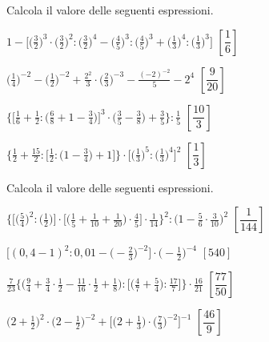 \begin{esercizio}[\Ast]
\label{ese:3.149}
Calcola il valore delle seguenti espressioni.
\begin{enumeratea}
\spazielenx
\item \(\displaystyle{1-\bigg[\bigg(\frac{3}{2}\bigg)^{3}\cdot%
\bigg(\frac{3}{2}\bigg)^{2}:\bigg(\frac{3}{2}\bigg)^{4}-
\bigg(\frac{4}{5}\bigg)^{3}:\bigg(\frac{4}{5}\bigg)^{3}+%
\bigg(\frac{1}{3}\bigg)^{4}:\bigg(\frac{1}{3}\bigg)^{3}\bigg]}\)
  \hfill \(\left[\dfrac{1}{6} \right]\)
\item \(\displaystyle{\bigg(\frac{1}{4}\bigg)^{-2}-\bigg(\frac{1}{2}\bigg)^{-2}+
\frac{2^{2}}{3}\cdot%
\bigg(\frac{2}{3}\bigg)^{-3}-\frac{(-2)^{-2}}{5}-2^{4}}\)
  \hfill \(\left[\dfrac{9}{20} \right]\)
\item \(\displaystyle{\bigg\{\bigg[\frac{1}{6}+\frac{1}{2}:\bigg(\frac{6}{8}+1-
\frac{3}{4}\bigg)\bigg]^{3}\cdot%
\bigg(\frac{3}{5}-\frac{3}{8}\bigg)+\frac{3}{5}\bigg\}:\frac{1}{5}}\)
  \hfill \(\left[\dfrac{10}{3} \right]\)
\item \(\displaystyle{\bigg\{\frac{1}{2}+\frac{15}{2}:\bigg[\frac{1}{2}:
\bigg(1-\frac{3}{4}\bigg)+1\bigg]\bigg\}\cdot%
\bigg[\bigg(\frac{1}{3}\bigg)^{5}:\bigg(\frac{1}{3}\bigg)^{4}\bigg]^{2}}\)
  \hfill \(\left[\dfrac{1}{3} \right]\)
\end{enumeratea}
\end{esercizio}

\begin{esercizio}[\Ast]
\label{ese:3.150}
 Calcola il valore delle seguenti espressioni.
\begin{enumeratea}
\spazielenx
\item \(\displaystyle{\bigg\{\bigg[\bigg(\frac{5}{4}\bigg)^{2}:
\bigg(\frac{1}{2}\bigg)\bigg]\cdot%
\bigg[\bigg(\frac{1}{5}+\frac{1}{10}+\frac{1}{20}\bigg)\cdot\frac{4}{5}\bigg]
\cdot%
\frac{1}{14}\bigg\}^{2}:\bigg(1-\frac{5}{6}\cdot\frac{3}{10}\bigg)^{2}}\)
  \hfill \(\left[\dfrac{1}{144} \right]\)
\item \(\displaystyle{\bigg[(0,4-1)^{2}:0,01-\bigg(-{\frac{2}{3}}\bigg)^{-2}
\bigg]\cdot
\bigg(-{\frac{1}{2}}\bigg)^{-4}}\)
  \hfill \(\left[540 \right]\)
\item \(\displaystyle{\frac{7}{23}\bigg\{\bigg(\frac{9}{4}+\frac{3}{4}\cdot
{\frac{1}{2}}-\frac{11}{16}\cdot\frac{1}{2}+\frac{1}{8}\bigg):\bigg[
\bigg(\frac{4}{7}+\frac{5}{4}\bigg):\frac{17}{7}\bigg]\bigg\}\cdot
{\frac{16}{21}}}\)
  \hfill \(\left[\dfrac{77}{50} \right]\)
\item \(\displaystyle{\bigg(2+\frac{1}{2}\bigg)^{2} \cdot \bigg(2-\frac{1}{2}
\bigg)^{-2}+\bigg[\bigg(2+\frac{1}{3}\bigg)\cdot
\bigg(\frac{7}{3}\bigg)^{-2}\bigg]^{-1}}\)
  \hfill \(\left[\dfrac{46}{9} \right]\)
\end{enumeratea}
\end{esercizio}

